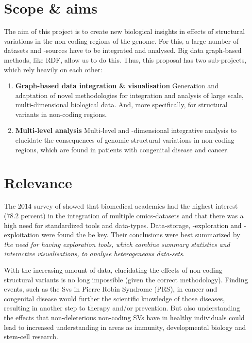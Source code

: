 \documentclass[twoside,fontsize=12pt]{article}
\begin{document}
\section*{Scope \& aims}
The aim of this project is to create new biological insights in effects of structural variations in the non-coding regions of the genome. For this, a large number of datasets and -sources have to be integrated and analysed. Big data graph-based methods, like RDF,  allow us to do this.
Thus, this proposal has two sub-projects, which rely heavily on each other:

\begin{enumerate}
\item \textbf{Graph-based data integration \& visualisation} 
Generation and adaptation of novel methodologies for integration and analysis of large scale, multi-dimensional biological data. And, more specifically, for structural variants in non-coding regions.
\item \textbf{Multi-level analysis} 
Multi-level and -dimensional integrative analysis to elucidate the consequences of genomic structural variations in non-coding regions, which are found in patients with congenital disease and cancer. 
\end{enumerate}
\section*{Relevance}
The 2014 survey of \citet{Gomez-Cabrero2014} showed that biomedical academics had the highest interest (78.2 percent) in the integration of multiple omics-datasets and that there was a high need for standardized tools and data-types. Data-storage, -exploration and -exploitation were found the be key. Their conclusions were best summarized by \textit{the need for having exploration tools, which combine summary statistics and interactive visualisations, to analyse heterogeneous data-sets}.
\medskip

\noindent
With the increasing amount of data, elucidating the effects of non-coding structural variants is no long impossible (given the correct methodology). Finding events, such as the Svs in Pierre Robin Syndrome (PRS), in cancer and congenital disease would further the scientific knowledge of those diseases, resulting in another step to therapy and/or prevention. But also understanding the effects that non-deleterious non-coding SVs have in healthy individuals could lead to increased understanding in areas as immunity, developmental biology and stem-cell research.
\medskip
\end{document}
